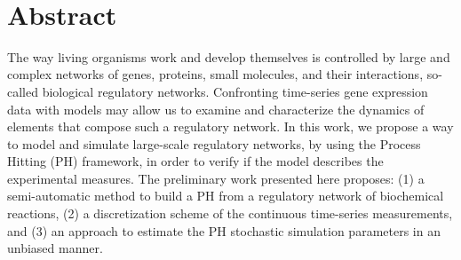\documentclass[11pt,a4paper,twoside]{epig}
\begin{document}
\\

\section*{Abstract}
\vspace{-2mm}
The way living organisms work and develop themselves is controlled by large and complex 
networks of genes, proteins, small molecules, and their interactions, so-called biological 
regulatory networks. Confronting time-series gene expression data with models may allow us to
examine and characterize the dynamics of elements that compose such a regulatory network. 
In this work, we propose a way to model and simulate large-scale regulatory networks, by using the 
Process Hitting (PH) framework, in order to verify if the model describes the experimental measures.
The preliminary work presented here proposes: (1) a semi-automatic method to build a PH from
a regulatory network of biochemical reactions, (2) a discretization scheme of the continuous time-series measurements, 
and (3) an approach to estimate the PH stochastic simulation parameters in an unbiased manner.
\vspace{-2mm}
\end{document}
